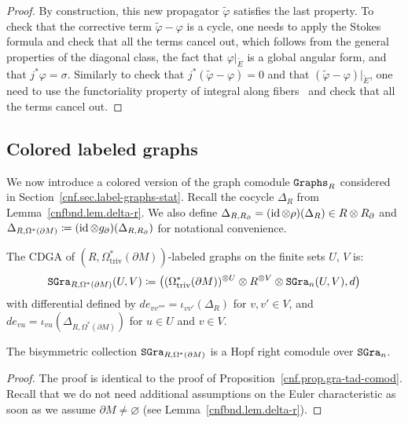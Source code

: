 \begin{proof}
  By construction, this new propagator $\tilde\varphi$ satisfies the last property.
  To check that the corrective term $\tilde\varphi - \varphi$ is a cycle, one needs to apply the Stokes formula and check that all the terms cancel out, which follows from the general properties of the diagonal class, the fact that $\varphi|_{\mathring{E}}$ is a global angular form, and that $j^{*}\varphi = \sigma$.
  Similarly to check that $j^{*}(\tilde\varphi - \varphi) = 0$ and that $(\tilde\varphi - \varphi)|_{\mathring{E}}$, one need to use the functoriality property of integral along fibers~\cite[Proposition~8.9]{HardtLambrechtsTurchinVolic2011} and check that all the terms cancel out.
\end{proof}

\subsection{Colored labeled graphs}
\label{cnfbnd.sec.colored-labeled-graphs}

We now introduce a colored version of the graph comodule $\mathtt{Graphs}_{R}$ considered in Section~\ref{cnf.sec.label-graphs-stat}.
Recall the cocycle $\Delta_{R}$ from Lemma~\ref{cnfbnd.lem.delta-r}.
We also define $\Delta_{R,R_{\partial}} = (\operatorname{id} \otimes \rho)(\Delta_{R}) \in R \otimes R_{\partial}$ and $\Delta_{R, \Omega^{*}(\partial M)} \coloneqq (\operatorname{id} \otimes g_{\partial})(\Delta_{R,R_{\partial}})$ for notational convenience.

\begin{definition}
  The CDGA of $(R, \Omega_{\mathrm{triv}}^{*}(\partial M))$-labeled graphs on the finite sets $U$, $V$ is:
  \[ \mathtt{SGra}_{R, \Omega^{*}(\partial M)}(U,V) \coloneqq \bigl( (\Omega_{\mathrm{triv}}^{*}(\partial M))^{\otimes U} \otimes R^{\otimes V} \otimes \mathtt{SGra}_{n}(U,V), d \bigr) \]
  with differential defined by $de_{vv''''} = \iota_{vv'}(\Delta_{R})$ for $v, v' \in V$, and $de_{vu} = \iota_{vu}(\Delta_{R,\Omega^{*}(\partial M)})$ for $u \in U$ and $v \in V$.
\end{definition}

\begin{proposition}
  The bisymmetric collection $\mathtt{SGra}_{R, \Omega^{*}(\partial M)}$ is a Hopf right comodule over $\mathtt{SGra}_{n}$.
\end{proposition}

\begin{proof}
  The proof is identical to the proof of Proposition~\ref{cnf.prop.gra-tad-comod}.
  Recall that we do not need additional assumptions on the Euler characteristic as soon as we assume $\partial M \neq \varnothing$ (see Lemma~\ref{cnfbnd.lem.delta-r}).
\end{proof}

